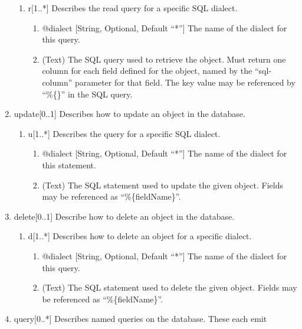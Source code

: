 \documentclass{book}
\begin{document}
\begin{enumerate}
    \begin{enumerate}
        \item r[1..*] Describes the read query for a specific SQL dialect.
            \begin{enumerate}
            \item @dialect [String, Optional, Default ``*''] The name of the
                  dialect for this query.
            \item (Text) The SQL query used to retrieve the object. Must return
                  one column for each field defined for the object, named by the
                  ``sql-column'' parameter for that field. The key value may be
                  referenced by ``\%\{\}'' in the SQL query.
        \end{enumerate}
    \end{enumerate}
    \item update[0..1] Describes how to update an object in the database.
    \begin{enumerate}
        \item u[1..*] Describes the query for a specific SQL dialect.
        \begin{enumerate}
            \item @dialect [String, Optional, Default ``*''] The name of the
                  dialect for this statement.
            \item (Text) The SQL statement used to update the given object.
                  Fields may be referenced as ``\%\{fieldName\}''.
        \end{enumerate}
    \end{enumerate}
    \item delete[0..1] Describe how to delete an object in the database.
    \begin{enumerate}
        \item d[1..*] Describes how to delete an object for a specific dialect.
        \begin{enumerate}
            \item @dialect [String, Optional, Default ``*''] The name of the
              dialect for this query.
            \item (Text) The SQL statement used to delete the given object.
                  Fields may be referenced as ``\%\{fieldName\}''.
        \end{enumerate}
    \end{enumerate}
    \item query[0..*] Describes named queries on the database. These each emit

\end{enumerate}
\end{document}
